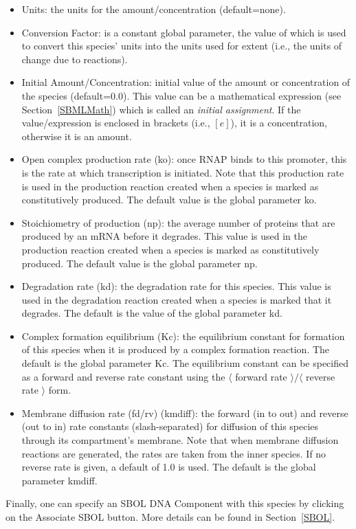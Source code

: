 \documentclass[titlepage,11pt]{article}
\begin{document}
\begin{itemize}
\item Units: the units for the amount/concentration (default=none).
\item Conversion Factor: is a constant global parameter, the value of which is used to convert this species' units into the units used for extent (i.e., the units of change due to reactions).
\item Initial Amount/Concentration: initial value of the amount or concentration of the species (default=0.0).  This value can be a mathematical expression (see Section~\ref{SBMLMath}) which is called an \emph{initial assignment}.  If the value/expression is enclosed in brackets (i.e., $[e]$), it is a concentration, otherwise it is an amount.  
\item Open complex production rate (ko): once RNAP binds to this promoter, this is the rate at which transcription is initiated.  Note that this production rate is used in the production reaction created when a species is marked as constitutively produced.  The default value is the global parameter ko.
\item Stoichiometry of production (np): the average number of proteins that are produced by an mRNA before it degrades.  This value is used in the production reaction created when a species is marked as constitutively produced.  The default value is the global parameter np.
\item Degradation rate (kd): the degradation rate for this species.  This value is used in the degradation reaction created when a species is marked that it degrades.  The default is the value of the global parameter kd.  
\item Complex formation equilibrium (Kc): the equilibrium constant for formation of this species when it is produced by a complex formation reaction.  The default is the global parameter Kc.  The equilibrium constant can be specified as a forward and reverse rate constant using the $\langle$ forward rate $\rangle / \langle$ reverse rate $\rangle$ form.
\item Membrane diffusion rate (fd/rv) (kmdiff): the forward (in to out) and reverse (out to in) rate constants (slash-separated) for diffusion of this species through its compartment's membrane.  Note that when membrane diffusion reactions are generated, the rates are taken from the inner species.  If no reverse rate is given, a default of 1.0 is used.  The default is the global parameter kmdiff.
\end{itemize}
Finally, one can specify an SBOL DNA Component with this species by clicking on the Associate SBOL button.  More details can be found in Section~\ref{SBOL}.
\end{document}
